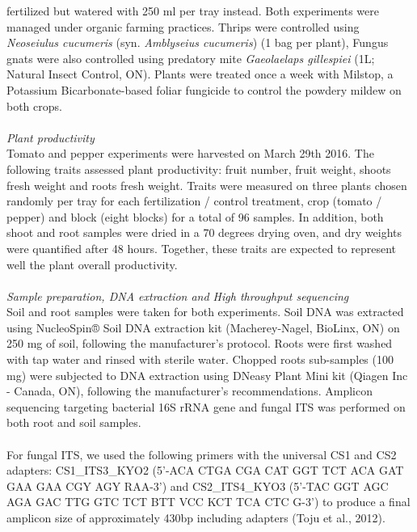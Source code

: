 \documentclass[12pt,]{article}
\begin{document}
fertilized but watered with 250 ml per tray instead. Both experiments
were managed under organic farming practices. Thrips were controlled
using \emph{Neoseiulus cucumeris} (syn. \emph{Amblyseius cucumeris}) (1
bag per plant), Fungus gnats were also controlled using predatory mite
\emph{Gaeolaelaps gillespiei} (1L; Natural Insect Control, ON). Plants
were treated once a week with Milstop, a Potassium Bicarbonate-based
foliar fungicide to control the powdery mildew on both crops.\\
\hspace*{0.333em}\\
\emph{Plant productivity}\\
Tomato and pepper experiments were harvested on March 29th 2016. The
following traits assessed plant productivity: fruit number, fruit
weight, shoots fresh weight and roots fresh weight. Traits were measured
on three plants chosen randomly per tray for each fertilization /
control treatment, crop (tomato / pepper) and block (eight blocks) for a
total of 96 samples. In addition, both shoot and root samples were dried
in a 70 degrees drying oven, and dry weights were quantified after 48
hours. Together, these traits are expected to represent well the plant
overall productivity.\\
\hspace*{0.333em}\\
\emph{Sample preparation, DNA extraction and High throughput
sequencing}\\
Soil and root samples were taken for both experiments. Soil DNA was
extracted using NucleoSpin® Soil DNA extraction kit (Macherey-Nagel,
BioLinx, ON) on 250 mg of soil, following the manufacturer's protocol.
Roots were first washed with tap water and rinsed with sterile water.
Chopped roots sub-samples (100 mg) were subjected to DNA extraction
using DNeasy Plant Mini kit (Qiagen Inc - Canada, ON), following the
manufacturer's recommendations. Amplicon sequencing targeting bacterial
16S rRNA gene and fungal ITS was performed on both root and soil
samples.\\
\hspace*{0.333em}\\
For fungal ITS, we used the following primers with the universal CS1 and
CS2 adapters: CS1\_ITS3\_KYO2 (5'-ACA CTGA CGA CAT GGT TCT ACA GAT GAA
GAA CGY AGY RAA-3') and CS2\_ITS4\_KYO3 (5'-TAC GGT AGC AGA GAC TTG GTC
TCT BTT VCC KCT TCA CTC G-3') to produce a final amplicon size of
approximately 430bp including adapters (Toju et al., 2012).\\
\end{document}
